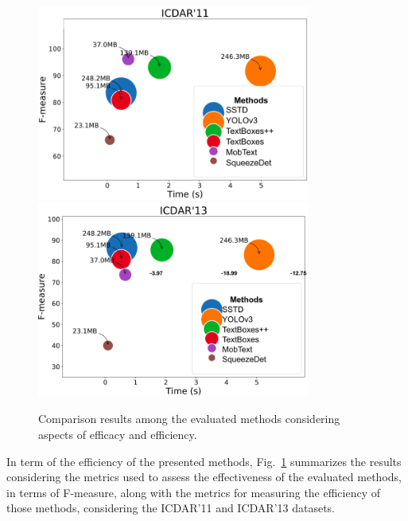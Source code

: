 \begin{figure}[!h]
    \centering
    \includegraphics[width=0.80\textwidth]{ICIP_frankenstein/figs/deep-methods-icdar11-f-measure.png} \\
    \includegraphics[width=0.80\textwidth]{ICIP_frankenstein/figs/deep-methods-icdar13-f-measure.png}
    \caption{Comparison results among the evaluated methods considering aspects of efficacy and efficiency.}
    \label{fig:deep-methods-efficacy-and-efficiency}
\end{figure}

In term of 
the efficiency of the presented methods, 
Fig.~\ref{fig:deep-methods-efficacy-and-efficiency} summarizes the results considering the metrics used to assess the effectiveness of the evaluated methods, in terms of F-measure, along with the metrics for measuring the efficiency of those methods, considering the ICDAR'11 and ICDAR'13 datasets.

